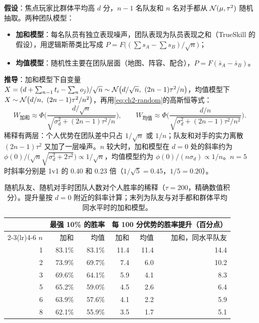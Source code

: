 \textbf{假设}：焦点玩家比群体平均高 $d$ 分，$n-1$ 名队友和 $n$ 名对手都从 $\mathcal{N}(\mu,\tau^2)$ 随机抽取。两种团队模型：
\begin{itemize}
\item \textbf{加和模型}：每名队员有独立表现噪声，团队表现为队员表现之和（TrueSkill 的假设\cite{herbrich2006trueskill}\tagLit），用逻辑斯蒂类比写成 $P=F\bigl((\sum s_A-\sum s_B)/\sqrt n\bigr)$；
\item \textbf{均值模型}：随机性主要在团队层面（地图、阵容、配合），$P=F(\bar s_A-\bar s_B)$。
\end{itemize}
\textbf{推导}：加和模型下自变量 $X=(d+\sum_{n-1}t_i-\sum_n o_j)/\sqrt n\sim\mathcal{N}\bigl(d/\sqrt n,\ (2n-1)\tau^2/n\bigr)$，均值模型下 $X\sim\Normal\bigl(d/n,\ (2n-1)\tau^2/n^2\bigr)$，再用\cref{eq:ch2-random}的高斯恒等式：
\begin{equation}
  W_{\text{加和}}\approx\Phi\Biggl(\frac{d/\sqrt n}{\sqrt{\sigma_d^2+(2n-1)\tau^2/n}}\Biggr),\qquad
  W_{\text{均值}}\approx\Phi\Biggl(\frac{d/n}{\sqrt{\sigma_d^2+(2n-1)\tau^2/n^2}}\Biggr).
  \label{eq:ch2-team}
\end{equation}
稀释有两层：个人优势在团队差中只占 $1/\sqrt n$ 或 $1/n$；队友和对手的实力离散 $(2n-1)\tau^2$ 又加了一层噪声。$n$ 较大时，加和模型在 $d=0$ 处的斜率约为 $\phi(0)/\bigl(\sqrt n\sqrt{\sigma_d^2+2\tau^2}\bigr)\propto1/\sqrt n$，均值模型约为 $\phi(0)/(n\sigma_d)\propto1/n$。$n=5$ 时斜率分别是 1v1 的 0.40 和 0.23 倍（$1/\sqrt5=0.45$，$1/5=0.20$）\tagOwn。

\begin{table}[htbp]
  \centering\small
  \caption{随机队友、随机对手时团队人数对个人胜率的稀释（$\tau=200$，精确数值积分）。提升量按 $d=0$ 附近的斜率计算；末列为队友与对手都和群体平均同水平时的加和模型。\tagOwn}
  \label{tab:ch2-team}
  \setlength{\tabcolsep}{5pt}
  \begin{tabular}{rrrrrr}
    \toprule
    & \multicolumn{2}{c}{最强 10\% 的胜率} & \multicolumn{3}{c}{每 100 分优势的胜率提升（百分点）}\\
    \cmidrule(lr){2-3}\cmidrule(lr){4-6}
    $n$ & 加和 & 均值 & 加和 & 均值 & 加和，同水平队友\\
    \midrule
    1 & 83.1\% & 83.1\% & 11.4 & 11.4 & 14.4\\
    2 & 73.9\% & 69.7\% & 7.4 & 6.0 & 10.2\\
    3 & 69.6\% & 64.1\% & 5.9 & 4.1 & 8.3\\
    5 & 65.2\% & 59.0\% & 4.5 & 2.6 & 6.4\\
    6 & 63.9\% & 57.6\% & 4.1 & 2.2 & 5.9\\
    8 & 62.1\% & 55.9\% & 3.5 & 1.7 & 5.1\\
    \bottomrule
  \end{tabular}
\end{table}

